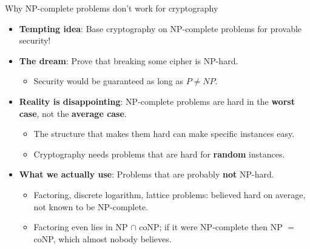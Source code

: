 \ifdefined\PRESENTATION\else\PassOptionsToClass{handout}{beamer}\fi\documentclass[aspectratio=169, lualatex]{beamer}
\begin{document}
\begin{frame}{Why NP-complete problems don't work for cryptography}
	\begin{itemize}[<+->]
		\item \textbf{Tempting idea}: Base cryptography on NP-complete problems for provable security!
		\item \textbf{The dream}: Prove that breaking some cipher is NP-hard.
		      \begin{itemize}
			      \item Security would be guaranteed as long as $P \neq NP$.
		      \end{itemize}
		\item \textbf{Reality is disappointing}: NP-complete problems are hard in the \textbf{worst case}, not the \textbf{average case}.
		      \begin{itemize}
			      \item The structure that makes them hard can make specific instances easy.
			      \item Cryptography needs problems that are hard for \textbf{random} instances.
		      \end{itemize}
		\item \textbf{What we actually use}: Problems that are probably \textbf{not} NP-hard.
		      \begin{itemize}
			      \item Factoring, discrete logarithm, lattice problems: believed hard on average, not known to be NP-complete.
			      \item Factoring even lies in NP $\cap$ coNP; if it were NP-complete then NP $=$ coNP, which almost nobody believes.
		      \end{itemize}
	\end{itemize}
\end{frame}
\end{document}
